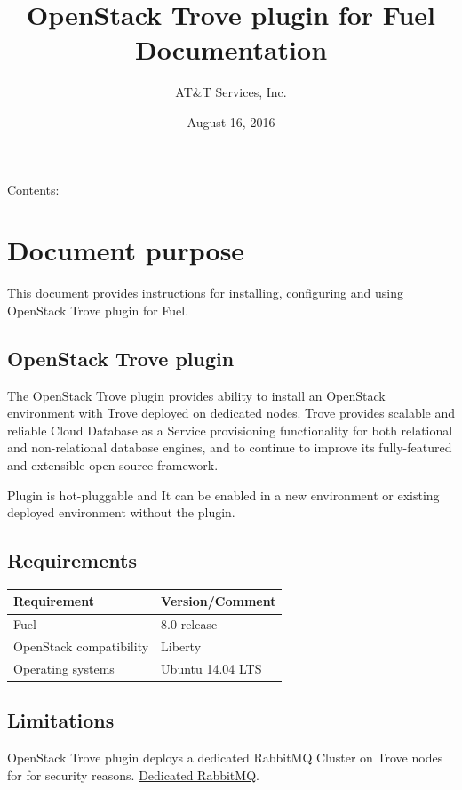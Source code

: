 \documentclass[letterpaper,10pt,english]{sphinxmanual}
\title{OpenStack Trove plugin for Fuel Documentation}
\date{August 16, 2016}
\author{AT\&T Services, Inc.}
\begin{document}
\maketitle
\tableofcontents
{}\label{index::doc}


Contents:


\chapter{Document purpose}
\label{overview::doc}\label{overview:welcome-to-openstack-trove-plugin-for-fuel-s-documentation}\label{overview:document-purpose}\label{overview:overview}
This document provides instructions for installing, configuring and using
OpenStack Trove plugin for Fuel.


\section{OpenStack Trove plugin}
\label{overview:openstack-trove-plugin}
The OpenStack Trove plugin provides ability to install an OpenStack
environment with Trove deployed on dedicated nodes. Trove provides
scalable and reliable Cloud Database as a Service provisioning functionality
for both relational and non-relational database engines, and to continue to
improve its fully-featured and extensible open source framework.

Plugin is hot-pluggable and It can be enabled in a new environment or existing
deployed environment without the plugin.


\section{Requirements}
\label{overview:requirements}
\begin{tabulary}{\linewidth}{|L|L|}
\hline
\textsf{\relax 
Requirement
} & \textsf{\relax 
Version/Comment
}\\
\hline
Fuel
 & 
8.0 release
\\

OpenStack compatibility
 & 
Liberty
\\

Operating systems
 & 
Ubuntu 14.04 LTS
\\
\hline\end{tabulary}



\section{Limitations}
\label{overview:limitations}
OpenStack Trove plugin deploys a dedicated RabbitMQ Cluster on Trove nodes for
for security reasons.
\href{http://lists.openstack.org/pipermail/openstack-dev/2015-April/061759.html/}{Dedicated RabbitMQ}.
\end{document}
